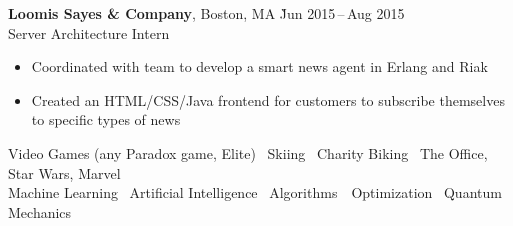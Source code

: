 \documentclass[11pt]{article}
\newcommand{\ressection}[1]{%
  \vspace{12pt}{\Large{\textsc{#1}}} \titlerule[0.5pt] \par
}
\begin{document}
\begin{tabbing}
  \textbf{Loomis Sayes \& Company}, Boston, MA \` Jun 2015\,--\,Aug 2015 \\
  Server Architecture Intern
\end{tabbing}
\begin{itemize}
  \item Coordinated with team to develop a smart news agent in Erlang and Riak
  \item Created an HTML/CSS/Java frontend for customers to subscribe themselves to specific types of news
\end{itemize}

\ressection{Interests}
\begin{center}
Video Games (any Paradox game, Elite) \textbullet\ Skiing \textbullet\ Charity Biking \textbullet\ The Office, Star Wars, Marvel \\
Machine Learning \textbullet\ Artificial Intelligence \textbullet\ Algorithms\ \textbullet\ Optimization \textbullet\ Quantum Mechanics
\end{center}
\end{document}
